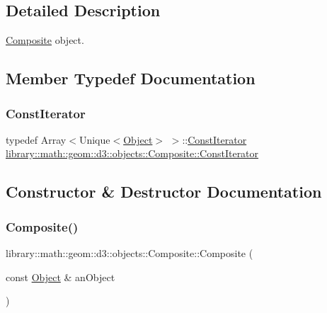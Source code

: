 \subsection{Detailed Description}
\hyperlink{classlibrary_1_1math_1_1geom_1_1d3_1_1objects_1_1_composite}{Composite} object. 

\subsection{Member Typedef Documentation}
\mbox{\label{classlibrary_1_1math_1_1geom_1_1d3_1_1objects_1_1_composite_a52745f3c676ff98e099683b978253fc5}} 
\subsubsection{\texorpdfstring{Const\+Iterator}{ConstIterator}}
{\footnotesize\ttfamily typedef Array$<$Unique$<$\hyperlink{classlibrary_1_1math_1_1geom_1_1d3_1_1_object}{Object}$>$ $>$\+::\hyperlink{classlibrary_1_1math_1_1geom_1_1d3_1_1objects_1_1_composite_a52745f3c676ff98e099683b978253fc5}{Const\+Iterator} \hyperlink{classlibrary_1_1math_1_1geom_1_1d3_1_1objects_1_1_composite_a52745f3c676ff98e099683b978253fc5}{library\+::math\+::geom\+::d3\+::objects\+::\+Composite\+::\+Const\+Iterator}}



\subsection{Constructor \& Destructor Documentation}
\mbox{\label{classlibrary_1_1math_1_1geom_1_1d3_1_1objects_1_1_composite_a65acc162c125c6ad463b26f21cb87c39}} 
\subsubsection{\texorpdfstring{Composite()}{Composite()}\hspace{0.1cm}{\footnotesize\ttfamily [1/4]}}
{\footnotesize\ttfamily library\+::math\+::geom\+::d3\+::objects\+::\+Composite\+::\+Composite (\begin{DoxyParamCaption}\item[{const \hyperlink{classlibrary_1_1math_1_1geom_1_1d3_1_1_object}{Object} \&}]{an\+Object }\end{DoxyParamCaption})\hspace{0.3cm}{\ttfamily [explicit]}}



